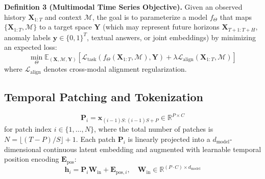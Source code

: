 \textbf{Definition 3 (Multimodal Time Series Objective).} Given an observed history $\mathbf{X}_{1:T}$ and context $\mathcal{M}$, the goal is to parameterize a model $f_\Theta$ that maps $\{\mathbf{X}_{1:T}, \mathcal{M}\}$ to a target space $\mathbf{Y}$ (which may represent future horizons $\mathbf{X}_{T+1:T+H}$, anomaly labels $\mathbf{y} \in \{0, 1\}^T$, textual answers, or joint embeddings) by minimizing an expected loss:
\begin{equation}
\min_\Theta \mathbb{E}_{(\mathbf{X}, \mathcal{M}, \mathbf{Y})} \left[ \mathcal{L}_{\text{task}}(f_\Theta(\mathbf{X}_{1:T}, \mathcal{M}), \mathbf{Y}) + \lambda \mathcal{L}_{\text{align}}(\mathbf{X}_{1:T}, \mathcal{M}) \right]
\label{eq:general_loss}
\end{equation}
where $\mathcal{L}_{\text{align}}$ denotes cross-modal alignment regularization.

\subsection{Temporal Patching and Tokenization}
\begin{equation}
\mathbf{P}_i = \mathbf{x}_{(i-1)S : (i-1)S + P} \in \mathbb{R}^{P \times C}
\end{equation}
for patch index $i \in \{1, \dots, N\}$, where the total number of patches is $N = \lfloor (T - P)/S \rfloor + 1$. Each patch $\mathbf{P}_i$ is linearly projected into a $d_{\text{model}}$-dimensional continuous latent embedding and augmented with learnable temporal position encoding $\mathbf{E}_{\text{pos}}$:
\begin{equation}
\mathbf{h}_i = \mathbf{P}_i \mathbf{W}_{\text{in}} + \mathbf{E}_{\text{pos}, i}, \quad \mathbf{W}_{\text{in}} \in \mathbb{R}^{(P \cdot C) \times d_{\text{model}}}
\label{eq:patch_projection}
\end{equation}

